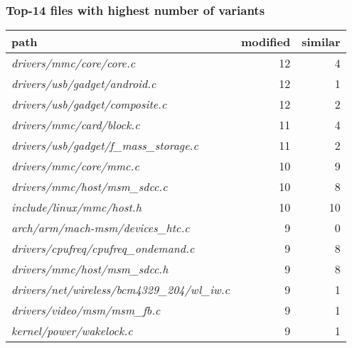 \documentclass[11pt]{beamer}
\begin{document}
\begin{frame}[fragile]
\frametitle{Top-14 files with highest number of variants}

\begin{tabular}{|l|r|r|}
\hline
path & modified & similar \\
\hline
\textit{drivers/mmc/core/core.c} & 12 & 4\\
\textit{drivers/usb/gadget/android.c} & 12 & 1\\
\textit{drivers/usb/gadget/composite.c} & 12 & 2\\
\textit{drivers/mmc/card/block.c} & 11 & 4\\
\textit{drivers/usb/gadget/f\_mass\_storage.c} & 11 & 2\\
\textit{drivers/mmc/core/mmc.c} & 10 & 9\\
\textit{drivers/mmc/host/msm\_sdcc.c} & 10 & 8\\
\textit{include/linux/mmc/host.h} & 10 & 10\\
\textit{arch/arm/mach-msm/devices\_htc.c} & 9 & 0\\
\textit{drivers/cpufreq/cpufreq\_ondemand.c}  & 9 & 8\\
\textit{drivers/mmc/host/msm\_sdcc.h} & 9 & 8\\
\textit{drivers/net/wireless/bcm4329\_204/wl\_iw.c} & 9 & 1\\
\textit{drivers/video/msm/msm\_fb.c}  & 9 & 1\\
\textit{kernel/power/wakelock.c} & 9 & 1\\
\hline
\end{tabular}
\end{frame}
\end{document}
